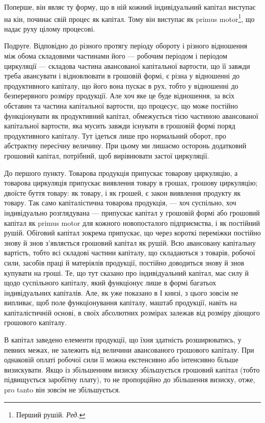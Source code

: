 
Поперше, він являє ту форму, що в ній кожний індивідуальний капітал
виступає на кін, починає свій процес як капітал. Тому він виступає
як primus motor\footnote*{
Перший рушій. \emph{Ред.}
}, що надає руху цілому процесові.

Подруге. Відповідно до різного протягу періоду обороту і різного
відношення між обома складовими частинами його — робочим періодом і
періодом циркуляції — складова частина авансованої капітальної вартости,
що її завжди треба авансувати і відновлювати в грошовій формі, є різна
у відношенні до продуктивного капіталу, що його вона пускає в рух,
тобто у відношенні до безперервного розміру продукції. Але хоч яке
це буде відношення, за всіх обставин та частина капітальної вартости,
що процесує, що може постійно функціонувати як продуктивний капітал,
обмежується тією частиною авансованої капітальної вартости, яка мусить
завжди існувати в грошовій формі поряд продуктивного капіталу. Тут
ідеться лише про нормальний оборот, про абстрактну пересічну величину.
При цьому ми лишаємо осторонь додатковий грошовий капітал,
потрібний, щоб вирівнювати застої циркуляції.

До першого пункту. Товарова продукція припускає товарову
циркуляцію, а товарова циркуляція припускає виявлення товару в грошах,
грошову циркуляцію; двоїсте буття товару: як товару, і як грошей,
є закон виявлення продукту як товару. Так само капіталістична товарова
продукція, — хоч суспільно, хоч індивідуально розглядувана —
припускає капітал у грошовій формі або грошовий капітал як primus
motor для кожного новопосталого підприємства, і як постійний рушій. Обіговий
капітал зокрема припускає, що через короткі переміжки постійно
знову й знов з’являється грошовий капітал як рушій. Всю авансовану
капітальну вартість, тобто всі складові частини капіталу, що складаються
з товарів, робочої сили, засобів праці й матеріялів продукції, постійно
доводиться знову й знов купувати на гроші. Те, що тут сказано про індивідуальний
капітал, має силу й щодо суспільного капіталу, який функціонує
лише в формі багатьох індивідуальних капіталів. Але, як уже показано
в І книзі, з цього зовсім не випливає, щоб поле функціонування
капіталу, маштаб продукції, навіть на капіталістичній основі, в своїх
абсолютних розмірах залежав від розміру діющого грошового капіталу.

В капітал заведено елементи продукції, що їхня здатність розширюватись,
у певних межах, не залежить від величини авансованого грошового
капіталу. При однаковій оплаті робочої сили її можна екстенсивно
або інтенсивно більше визискувати. Якщо із збільшенням визиску збільшується
грошовий капітал (тобто підвищується заробітну плату), то не
пропорційно до збільшення визиску, отже, pro tanto він зовсім не збільшується.

